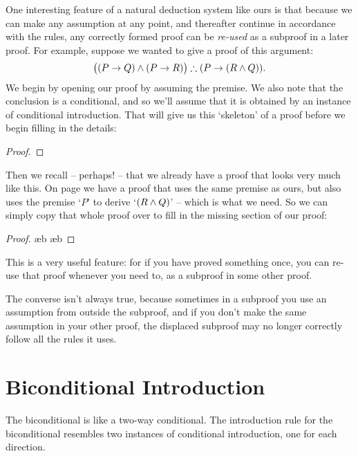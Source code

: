 One interesting feature of a natural deduction system like ours is that because we can make any assumption at any point, and thereafter continue in accordance with the rules, any correctly formed proof can be \emph{re-used} as a subproof in a later proof. For example, suppose we wanted to give a proof of this argument:  $$\bigl((P \rightarrow Q)\wedge(P \rightarrow R)\bigr) \mathrel{\therefore} (P \rightarrow (R \wedge Q)).$$ We begin by opening our proof by assuming the premise. We also note that the conclusion is a conditional, and so we'll assume that it is obtained by an instance of conditional introduction. That will give us this `skeleton' of a proof before we begin filling in the details:
 \begin{proof}
	\open
	\close
\end{proof}
Then we recall – perhaps! – that we already have a proof that looks very much like this. On page \pageref{proof.within} we have a proof that uses the same premise as ours, but also uses the premise `$P$' to derive `$(R \wedge Q)$' – which is what we need. So we can simply copy that whole proof over to fill in the missing section of our proof:
 \begin{proof}
	\open
	\ae{b}
	\ae{b}
	\close
\end{proof}
This is a very useful feature: for if you have proved something once, you can re-use that proof whenever you need to, as a subproof in some other proof. 

The converse isn't always true, because sometimes in a subproof you use an assumption from outside the subproof, and if you don't make the same assumption in your other proof, the displaced subproof may no longer correctly follow all the rules it uses. 



\section{Biconditional Introduction} \label{biint} 
The biconditional is like a two-way conditional. The introduction rule for the biconditional resembles two instances of conditional introduction, one for each direction.


